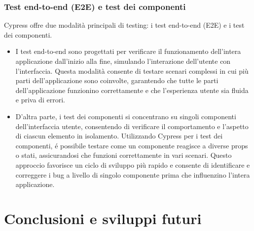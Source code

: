 \documentclass[target=bach,aauheader=,style=]{thud}
\begin{document}
\subsection{Test end-to-end (E2E) e test dei componenti}
Cypress offre due modalità principali di testing: i test end-to-end (E2E) e i test dei componenti.

\begin{itemize}
    \item I test end-to-end sono progettati per verificare il funzionamento dell'intera applicazione dall'inizio alla fine, simulando l'interazione dell'utente con l'interfaccia. Questa modalità consente di testare scenari complessi in cui più parti dell'applicazione sono coinvolte, garantendo che tutte le parti dell'applicazione funzionino correttamente e che l'esperienza utente sia fluida e priva di errori. 
    \item D'altra parte, i test dei componenti si concentrano su singoli componenti dell'interfaccia utente, consentendo di verificare il comportamento e l'aspetto di ciascun elemento in isolamento. Utilizzando Cypress per i test dei componenti, é possibile testare come un componente reagisce a diverse props o stati, assicurandosi che funzioni correttamente in vari scenari. Questo approccio favorisce un ciclo di sviluppo più rapido e consente di identificare e correggere i bug a livello di singolo componente prima che influenzino l'intera applicazione.
\end{itemize}
    

\chapter{Conclusioni e sviluppi futuri}







\end{document}
